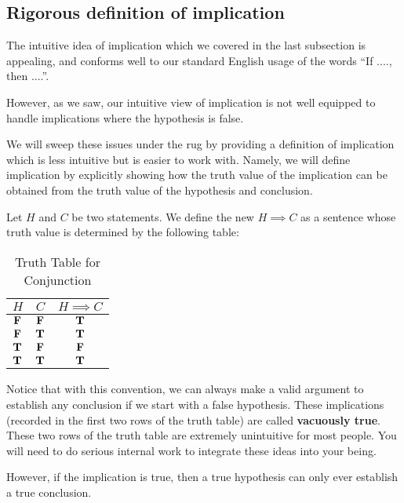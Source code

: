 \subsection{Rigorous definition of implication}

The intuitive idea of implication which we covered in the last subsection is appealing, and conforms well to our standard English usage of the words ``If ...., then ....''.

However, as we saw, our intuitive view of implication is not well equipped to handle implications where the hypothesis is false.

We will sweep these issues  under the rug by providing a definition of implication which is less intuitive but is easier to work with.  Namely, we will define implication by explicitly showing how the truth value of the implication can be obtained from the truth value of the hypothesis and conclusion.

\begin{definition}
	Let $H$ and $C$ be two statements.  We define the new  $H \implies C$ as a sentence whose truth value is determined by the following table:
	
	
	\begin{table}[h!]
		\begin{center}
			\caption{Truth Table for Conjunction}
			\begin{tabular}{c|c|c} 
				$H$ & $C$ & $H \implies  C$ \\
				\hline
				$\textbf{\textrm{F}}$ & $\textbf{\textrm{F}}$ & $\textbf{\textrm{T}}$ \\ 
				$\textbf{\textrm{F}}$ & $\textbf{\textrm{T}}$ & $\textbf{\textrm{T}}$ \\ 
				$\textbf{\textrm{T}}$ & $\textbf{\textrm{F}}$ & $\textbf{\textrm{F}}$ \\ 
				$\textbf{\textrm{T}}$ & $\textbf{\textrm{T}}$ & $\textbf{\textrm{T}}$ \\ 
			\end{tabular}
		\end{center}
	\end{table}
\end{definition}

Notice that with this convention, we can always make a valid argument to establish any conclusion if we start with a false hypothesis.  These implications (recorded in the first two rows of the truth table) are called \textbf{vacuously true}.  These two rows of the truth table are extremely unintuitive for most people.  You will need to do serious internal work to integrate these ideas into your being.

However, if the implication is true, then a true hypothesis can only ever establish a true conclusion.

